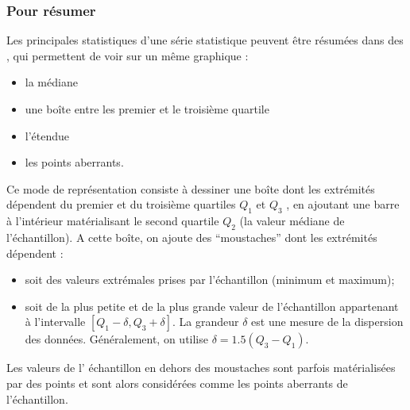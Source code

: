 \documentclass[letterpaper,10pt,french]{sphinxmanual}
\begin{document}
\subsubsection{Pour résumer}
\label{\detokenize{statsdescriptives:pour-resumer}}\label{\detokenize{statsdescriptives:boxplot}}
\sphinxAtStartPar
Les principales statistiques d’une série statistique peuvent être résumées dans des , qui permettent de voir sur un même graphique :
\begin{itemize}
\item {} 
\sphinxAtStartPar
la médiane

\item {} 
\sphinxAtStartPar
une boîte entre les premier et le troisième quartile

\item {} 
\sphinxAtStartPar
l’étendue

\item {} 
\sphinxAtStartPar
les points aberrants.

\end{itemize}

\sphinxAtStartPar
Ce mode de représentation consiste à dessiner une boîte dont les extrémités dépendent du premier et du troisième quartiles \(Q_1\) et \(Q_3\) , en ajoutant une barre à l’intérieur
matérialisant le second quartile  \(Q_2\) (la valeur médiane de l’échantillon). A cette boîte, on ajoute des “moustaches” dont les extrémités dépendent :
\begin{itemize}
\item {} 
\sphinxAtStartPar
soit des valeurs extrémales prises par l’échantillon (minimum et maximum);

\item {} 
\sphinxAtStartPar
soit de la plus petite et de la plus grande valeur de l’échantillon appartenant à l’intervalle \([Q_1 -\delta, Q_3+\delta ]\). La grandeur \(\delta\) est une mesure de la dispersion des données. Généralement, on utilise \(\delta = 1.5(Q_3-Q_1)\).

\end{itemize}

\sphinxAtStartPar
Les valeurs de l’ échantillon en dehors des moustaches sont parfois matérialisées par des points et sont alors considérées comme les points aberrants de l’échantillon.
\end{document}
